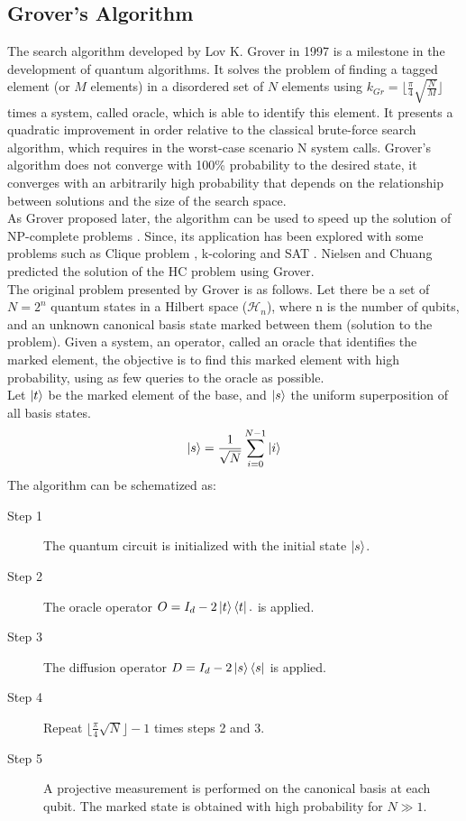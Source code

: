 \documentclass[10pt,a4paper]{article}
\begin{document}
\subsection{Grover's Algorithm}

The search algorithm developed by Lov K. Grover in 1997 \cite{Grover1} is a milestone in the development of quantum algorithms. It solves the problem of finding a tagged element (or $M$ elements) in a disordered set of $N$ elements using $k_{Gr}= \lfloor\frac{\pi}{4} \sqrt{\frac{N}{M}}\rfloor$ times a system, called oracle, which is able to identify this element. It presents a quadratic improvement in order relative to the classical brute-force search algorithm, which requires in the worst-case scenario N system calls. Grover's algorithm does not converge with 100\% probability to the desired state, it converges with an arbitrarily high probability that depends on the relationship between solutions and the size of the search space.\\
As Grover proposed later, the algorithm can be used to speed up the solution of NP-complete problems \cite{Grover2}. Since, its application has been explored with some problems such as Clique problem \cite{Clique, Clique2}, k-coloring \cite{Coloring1, Coloring2} and SAT \cite{SAT_ions, SAT_paralel}. Nielsen and Chuang predicted the solution of the HC problem using Grover\cite{Nielsen_Chuang_2010}.\\
The original problem presented by Grover \cite{Grover1} is as follows. Let there be a set of $N = 2^n$ quantum states in a Hilbert space ($\mathcal{H}_n$), where n is the number of qubits, and an unknown canonical basis state marked between them (solution to the problem). Given a system, an operator, called an oracle that identifies the marked element, the objective is to find this marked element with high probability, using as few queries to the oracle as possible.\\
Let $\ket{t}$ be the marked element of the base, and $\ket{s}$ the uniform superposition of all basis states.
$$\ket{s} = \frac{1}{\sqrt{N}} \sum_{i=0}^{N-1} \ket{i}$$
The algorithm can be schematized as:
\begin{description}
\item [Step 1] The quantum circuit is initialized with the initial state $\ket{s}$.
\item [Step 2] The oracle operator $O = I_d - 2\ket{t}\bra{t}.$ is applied.
\item [Step 3] The diffusion operator $D = I_d - 2\ket{s}\bra{s}$ is applied.
\item [Step 4] Repeat $\lfloor \frac{\pi}{4} \sqrt{N} \rfloor - 1$ times steps 2 and 3.
\item [Step 5] A projective measurement is performed on the canonical basis at each qubit. The marked state is obtained with high probability for $N \gg 1$.
\end{description}
\end{document}
